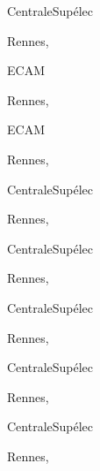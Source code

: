 \documentclass[11pt,a4paper,sans]{moderncv}
\newif\ifportuguese
\newif\iffrench
\newif\ifenglish
\newcommand\ml[3]{
  \ifenglish    {#1}\fi
  \ifportuguese {#2}\fi
  \iffrench     {#3}\fi
}
\begin{document}
\newcommand{\sep}{\ml{sep}{set.}{sept.}}
\newcommand{\apr}{\ml{apr}{abr.}{avr}}
\newcommand{\france}{\ml{France}{França}{France}}
{
  \ml
  {Tutoring}
  {Laboratório Automatique 2A}
  {TP Automatique 2A}}
{CentraleSupélec}
{\newline Rennes, \france}
{}
{
}

{
  \ml
  {Tutoring}
  {Laboratório Automatique 2A}
  {TP Analyse et commande dans l'espace d'état 2A}}
{ECAM}
{\newline Rennes, \france}
{}
{
  \ml
  {
  }
  {
  }
  {
  }
}

{
  \ml
  {Tutoring}
  {Laboratório Automatique 2A}
  {TP Asservissements 2A}}
{ECAM}
{\newline Rennes, \france}
{}
{
  \ml
  {
  }
  {
  }
  {
  }
}

{
  \ml
  {Tutoring}
  {Laboratório Automatique 2A}
  {TP Commande Prédictive pour bâtiment intelligen 2A}}
{CentraleSupélec}
{\newline Rennes, \france}
{}
{
  \ml
  {
  }
  {
  }
  {
  }
}


{
  \ml
  {Tutoring}
  {Laboratório Automatique 2A}
  {TP Commande Prédictive 3A}}
{CentraleSupélec}
{\newline Rennes, \france}
{}
{
  \ml
  {
  }
  {
  }
  {
  }
}

{
  \ml
  {Tutoring}
  {Laboratório Automatique 2A}
  {TP Commande Prédictive 3A}}
{CentraleSupélec}
{\newline Rennes, \france}
{}
{
  \ml
  {
  }
  {
  }
  {
  }
}

{
  \ml
  {Tutoring}
  {Laboratório Automatique 2A}
  {Projet Optimisation pour Microgrid isolé}}
{CentraleSupélec}
{\newline Rennes, \france}
{}
{
  \ml
  {
  }
  {
  }
  {
  }
}

{
  \ml
  {Tutoring}
  {Laboratório Automatique 2A}
  {TP Automatique 2A}}
{CentraleSupélec}
{\newline Rennes, \france}
{}
{
  \ml
  {
  }
  {
  }
  {
  }
}
\end{document}
